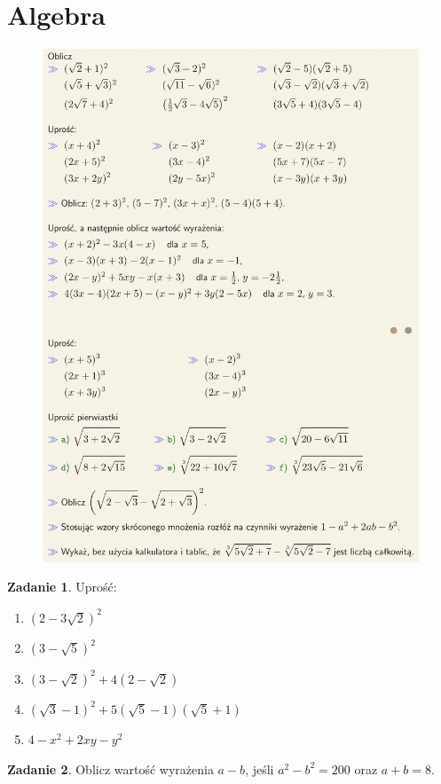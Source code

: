 \documentclass[11pt]{article}
\theoremstyle{definition}
\newtheorem{zad}{Zadanie}
\numberwithin{zad}{section}
\begin{document}
\section{Algebra}

\begin{figure}[H]
\centering
\includegraphics[width=0.9\linewidth]{alg1.png}
\end{figure}

\begin{zad}
Uprość:
\begin{enumerate}
\item $(2-3\sqrt2)^2$
\item $(3-\sqrt5)^2$
\item $(3-\sqrt2)^2+4(2-\sqrt2)$
\item $(\sqrt3-1)^2+5(\sqrt5-1)(\sqrt5+1)$
\item $4-x^2+2xy-y^2$
\end{enumerate}
\end{zad}

\begin{zad}
Oblicz wartość wyrażenia $a-b$, jeśli $a^2-b^2=200$ oraz $a+b=8$.
\end{zad}
\end{document}
